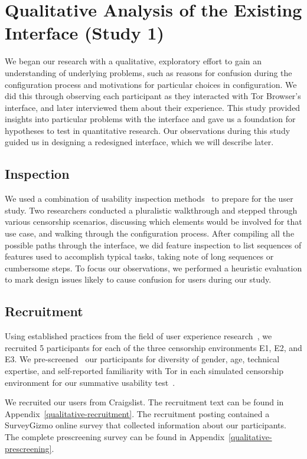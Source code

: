 \documentclass[USenglish,oneside,twocolumn]{article}
\begin{document}
\section{Qualitative Analysis of the Existing Interface (Study 1)}
\label{sec:qualitative}

We began our research with a qualitative, exploratory effort to gain an 
understanding of underlying problems, such as reasons for confusion 
during the configuration process and motivations for particular choices in 
configuration. We did this through observing each participant as they 
interacted with Tor Browser's interface, and later interviewed them about
their experience. This study provided insights into particular problems with 
the interface
and gave us a foundation
for hypotheses to test in quantitative research. 
Our observations during this study guided us in designing
a redesigned interface, which we will describe later.

\subsection{Inspection}
We used a combination of usability inspection methods~\cite{nielsen1994usability}
to prepare for the user study. Two researchers conducted a pluralistic 
walkthrough and stepped through various censorship
scenarios, discussing which elements would be involved for that use case, and walking 
through the configuration process. After compiling all the possible paths through the 
interface, we did feature inspection to list sequences
of features used to accomplish typical tasks, taking note of long sequences or cumbersome
steps. To focus our observations, we performed a heuristic evaluation to mark design issues 
likely to cause confusion for users during our study. 

\subsection{Recruitment}
Using established practices from the field of user experience research~\cite{howmanyusers},
we recruited 5 participants for each of the three censorship environments E1, E2, and E3.
We pre-screened~\cite{screening} our participants for diversity of gender, age, technical expertise,
and self-reported familiarity with Tor in each simulated censorship environment for our summative
usability test~\cite{summative}. 

We recruited our users from Craigslist. The recruitment text can be found in 
Appendix~\ref{qualitative-recruitment}. The recruitment posting contained a 
SurveyGizmo online survey that collected information about our participants.
The complete prescreening survey can be found in Appendix~\ref{qualitative-prescreening}.  
\end{document}
